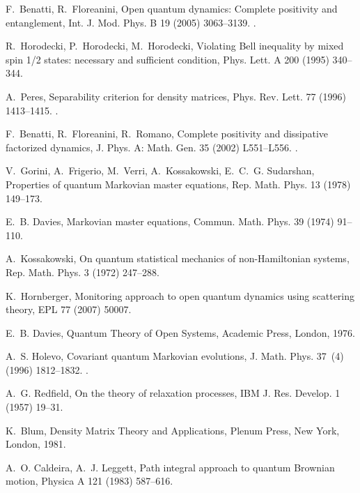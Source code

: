 \documentclass[3p,sort&compress,12pt]{elsarticle}
\begin{document}
\begin{thebibliography}{100}
F.~Benatti, R.~Floreanini, Open quantum dynamics: Complete positivity and
  entanglement, Int. J. Mod. Phys. B 19 (2005) 3063--3139.
\newblock \href {http://dx.doi.org/10.1142/S0217979205032097}
  {}.

R.~Horodecki, P.~Horodecki, M.~Horodecki, Violating {B}ell inequality by mixed
  spin 1/2 states: necessary and sufficient condition, Phys. Lett. A 200 (1995)
  340--344.

A.~Peres, Separability criterion for density matrices, Phys. Rev. Lett. 77
  (1996) 1413--1415.
\newblock \href {http://dx.doi.org/10.1103/PhysRevLett.77.1413}
  {}.

F.~Benatti, R.~Floreanini, R.~Romano, Complete positivity and dissipative
  factorized dynamics, J. Phys. A: Math. Gen. 35 (2002) L551--L556.
\newblock \href {http://dx.doi.org/10.1088/0305-4470/35/39/101}
  {}.

V.~Gorini, A.~Frigerio, M.~Verri, A.~Kossakowski, E.~C.~G. Sudarshan,
  Properties of quantum {M}arkovian master equations, Rep. Math. Phys. 13
  (1978) 149--173.

E.~B. Davies, Markovian master equations, Commun. Math. Phys. 39 (1974)
  91--110.

A.~Kossakowski, On quantum statistical mechanics of non-{H}amiltonian systems,
  Rep. Math. Phys. 3 (1972) 247--288.

K.~Hornberger, Monitoring approach to open quantum dynamics using scattering
  theory, EPL 77 (2007) 50007.

E.~B. Davies, Quantum Theory of Open Systems, Academic Press, London, 1976.

A.~S. Holevo, Covariant quantum {M}arkovian evolutions, J. Math. Phys. 37~(4)
  (1996) 1812--1832.
\newblock \href {http://dx.doi.org/10.1063/1.531481}
  {}.

A.~G. Redfield, On the theory of relaxation processes, IBM J. Res. Develop. 1
  (1957) 19--31.

K.~Blum, Density Matrix Theory and Applications, Plenum Press, New York,
  London, 1981.

A.~O. Caldeira, A.~J. Leggett, Path integral approach to quantum {B}rownian
  motion, Physica A 121 (1983) 587--616.


\end{thebibliography}
\end{document}

